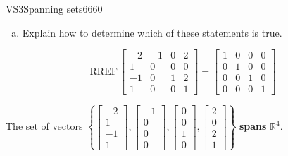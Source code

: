 \begin{exercise}{VS3}{Spanning sets}{6660}
\begin{exerciseStatement}
\begin{enumerate}[(a)]
\begin{itemize}
 
\end{itemize}

     
\item  

 Explain how to determine which of these statements is true. 

 
\end{enumerate}

     \end{exerciseStatement}
 \begin{exerciseAnswer} 

 \[
\mathrm{RREF}\, \left[\begin{array}{cccc}
-2 & -1 & 0 & 2 \\
1 & 0 & 0 & 0 \\
-1 & 0 & 1 & 2 \\
1 & 0 & 0 & 1
\end{array}\right] = \left[\begin{array}{cccc}
1 & 0 & 0 & 0 \\
0 & 1 & 0 & 0 \\
0 & 0 & 1 & 0 \\
0 & 0 & 0 & 1
\end{array}\right]
            \] 

 

 The set of vectors \(\left\{ \left[\begin{array}{c}
-2 \\
1 \\
-1 \\
1
\end{array}\right] , \left[\begin{array}{c}
-1 \\
0 \\
0 \\
0
\end{array}\right] , \left[\begin{array}{c}
0 \\
0 \\
1 \\
0
\end{array}\right] , \left[\begin{array}{c}
2 \\
0 \\
2 \\
1
\end{array}\right] \right\}\) \textbf{spans} \(\mathbb{R}^4\). 

 \end{exerciseAnswer}
 \end{exercise}


